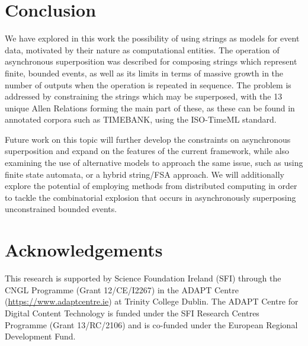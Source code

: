 \documentclass[a4paper,11pt,leqno]{article}
\begin{document}
\section{Conclusion}\label{conclusion}
We have explored in this work the possibility of using strings as models for 
event data, motivated by their nature as computational entities. The 
operation of asynchronous superposition was described for composing strings 
which represent finite, bounded events, as well as its limits in terms of 
massive growth in the number of outputs when the operation is repeated in 
sequence. The problem is addressed by 
constraining the strings which may be superposed, with the 13 unique 
Allen Relations forming the main part of these, as these can be found in 
annotated corpora such as TIMEBANK, using the ISO-TimeML standard.

Future work on this topic will further develop the constraints on asynchronous 
superposition and expand on the features of the current framework, while also 
examining the use of alternative models to approach the same issue, such as 
using finite state automata, or a hybrid string/FSA approach. We will 
additionally explore the potential of employing methods from distributed 
computing in order to tackle the combinatorial explosion that occurs in 
asynchronously superposing unconstrained bounded events.
\section*{Acknowledgements}
This research is supported by Science Foundation Ireland (SFI) through the CNGL 
Programme (Grant 12/CE/I2267) in the ADAPT Centre 
(\url{https://www.adaptcentre.ie}) at Trinity College Dublin. The
ADAPT Centre for Digital Content Technology is funded under the SFI Research 
Centres Programme (Grant 13/RC/2106) and is co-funded under the European 
Regional Development Fund.

{}

\end{document}
